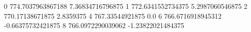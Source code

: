 0 774.7037963867188 7.36834716796875
1 772.6341552734375 5.2987060546875
2 770.17138671875 2.8359375
4 767.33544921875 0.0
6 766.6716918945312 -0.66375732421875
8 766.0972290039062 -1.23822021484375
